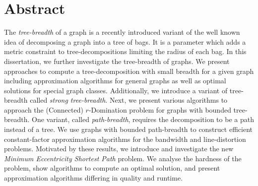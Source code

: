 \chapter*{Abstract}

The \emph{tree-breadth} of a graph is a recently introduced variant of the well known idea of decomposing a graph into a tree of bags.
It is a parameter which adds a metric constraint to tree-decompositions limiting the radius of each bag.
In this dissertation, we further investigate the tree-breadth of graphs.
We present approaches to compute a tree-decomposition with small breadth for a given graph including approximation algorithms for general graphs as well as optimal solutions for special graph classes.
Additionally, we introduce a variant of tree-breadth called \emph{strong tree-breadth}.
Next, we present various algorithms to approach the (Connected) $r$-Domination problem for graphs with bounded tree-breadth.
One variant, called \emph{path-breadth}, requires the decomposition to be a path instead of a tree.
We use graphs with bounded path-breadth to construct efficient constant-factor approximation algorithms for the bandwidth and line-distortion problems.
Motivated by these results, we introduce and investigate the new \emph{Minimum Eccentricity Shortest Path} problem.
We analyse the hardness of the problem, show algorithms to compute an optimal solution, and present approximation algorithms differing in quality and runtime.

